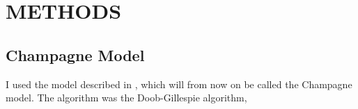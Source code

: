 \chapter{METHODS}

\section{Champagne Model}

I used the model described in \cite{champagne_using_2022}, which will from now on be called the Champagne model. The algorithm was the Doob-Gillespie algorithm, 